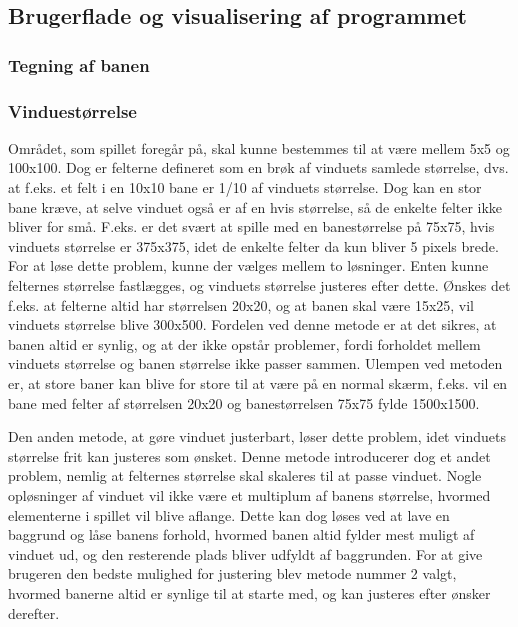 \subsection{Brugerflade og visualisering af programmet}

\subsubsection{Tegning af banen}

\subsubsection{Vinduestørrelse}

Området, som spillet foregår på, skal kunne bestemmes til at være mellem 5x5 og 100x100. Dog er felterne defineret som en brøk af vinduets samlede størrelse, dvs. at f.eks. et felt i en 10x10 bane er 1/10 af vinduets størrelse. Dog kan en stor bane kræve, at selve vinduet også er af en hvis størrelse, så de enkelte felter ikke bliver for små. F.eks. er det svært at spille med en banestørrelse på 75x75, hvis vinduets størrelse er 375x375, idet de enkelte felter da kun bliver 5 pixels brede. For at løse dette problem, kunne der vælges mellem to løsninger. Enten kunne felternes størrelse fastlægges, og vinduets størrelse justeres efter dette. Ønskes det f.eks. at felterne altid har størrelsen 20x20, og at banen skal være 15x25, vil vinduets størrelse blive 300x500. Fordelen ved denne metode er at det sikres, at banen altid er synlig, og at der ikke opstår problemer, fordi forholdet mellem vinduets størrelse og banen størrelse ikke passer sammen. Ulempen ved metoden er, at store baner kan blive for store til at være på en normal skærm, f.eks. vil en bane med felter af størrelsen 20x20 og banestørrelsen 75x75 fylde 1500x1500.

Den anden metode, at gøre vinduet justerbart, løser dette problem, idet vinduets størrelse frit kan justeres som ønsket. Denne metode introducerer dog et andet problem, nemlig at felternes størrelse skal skaleres til at passe vinduet. Nogle opløsninger af vinduet vil ikke være et multiplum af banens størrelse, hvormed elementerne i spillet vil blive aflange. Dette kan dog løses ved at lave en baggrund og låse banens forhold, hvormed banen altid fylder mest muligt af vinduet ud, og den resterende plads bliver udfyldt af baggrunden.
For at give brugeren den bedste mulighed for justering blev metode nummer 2 valgt, hvormed banerne altid er synlige til at starte med, og kan justeres efter ønsker derefter.

